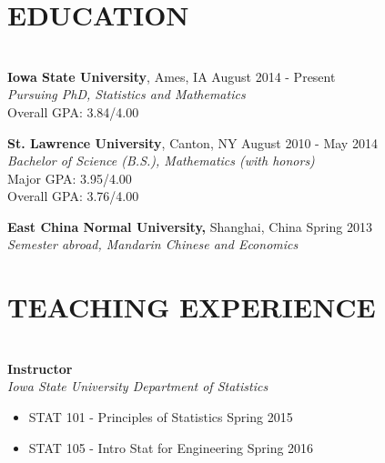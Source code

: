 \documentclass{res} %
\begin{document}
\address{
{\bf Department of Mathematics} \\
Iowa State University \\
244 Carver Hall \\
Ames, IA 50011 \\
}
\begin{resume}


\section{EDUCATION}

\hrulefill \\ %
{\bf Iowa State University}, Ames, IA \hfill August 2014 - Present \\
{\sl Pursuing PhD, Statistics and Mathematics} \\
Overall GPA: 3.84/4.00

{\bf St. Lawrence University}, Canton, NY \hfill August 2010 - May 2014 \\
{\sl Bachelor of Science (B.S.), Mathematics (with honors)} \\
Major GPA: 3.95/4.00 \\
Overall GPA: 3.76/4.00 

{\bf East China Normal University,} Shanghai, China \hfill Spring 2013 \\
{\sl Semester abroad, Mandarin Chinese and Economics} 





\section{TEACHING EXPERIENCE}

\hrulefill \\
{\bf Instructor} \\
{\sl Iowa State University Department of Statistics}
\begin{itemize} \itemsep -2pt
\item STAT 101 - Principles of Statistics \hfill Spring 2015
\item STAT 105 - Intro Stat for Engineering \hfill Spring 2016
\end{itemize}


\end{resume}
\end{document}
